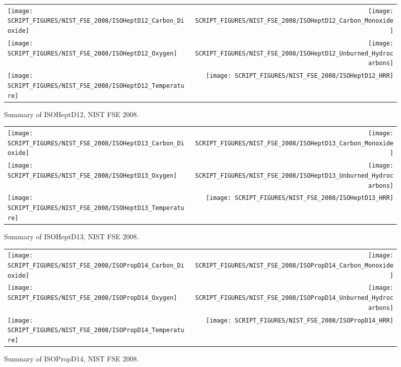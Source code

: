 \begin{figure}[h]
\begin{tabular*}{\textwidth}{l@{\extracolsep{\fill}}r}
\texttt{[image: SCRIPT\_FIGURES/NIST\_FSE\_2008/ISOHeptD12\_Carbon\_Dioxide]} &
\texttt{[image: SCRIPT\_FIGURES/NIST\_FSE\_2008/ISOHeptD12\_Carbon\_Monoxide]} \\
\texttt{[image: SCRIPT\_FIGURES/NIST\_FSE\_2008/ISOHeptD12\_Oxygen]} &
\texttt{[image: SCRIPT\_FIGURES/NIST\_FSE\_2008/ISOHeptD12\_Unburned\_Hydrocarbons]} \\
\texttt{[image: SCRIPT\_FIGURES/NIST\_FSE\_2008/ISOHeptD12\_Temperature]} &
\texttt{[image: SCRIPT\_FIGURES/NIST\_FSE\_2008/ISOHeptD12\_HRR]}
\end{tabular*}
\caption[Summary of ISOHeptD12, NIST FSE 2008]{Summary of ISOHeptD12, NIST FSE 2008.}
\label{NIST_FSE_1994_ISOHeptD12}
\end{figure}

\begin{figure}[h]
\begin{tabular*}{\textwidth}{l@{\extracolsep{\fill}}r}
\texttt{[image: SCRIPT\_FIGURES/NIST\_FSE\_2008/ISOHeptD13\_Carbon\_Dioxide]} &
\texttt{[image: SCRIPT\_FIGURES/NIST\_FSE\_2008/ISOHeptD13\_Carbon\_Monoxide]} \\
\texttt{[image: SCRIPT\_FIGURES/NIST\_FSE\_2008/ISOHeptD13\_Oxygen]} &
\texttt{[image: SCRIPT\_FIGURES/NIST\_FSE\_2008/ISOHeptD13\_Unburned\_Hydrocarbons]} \\
\texttt{[image: SCRIPT\_FIGURES/NIST\_FSE\_2008/ISOHeptD13\_Temperature]} &
\texttt{[image: SCRIPT\_FIGURES/NIST\_FSE\_2008/ISOHeptD13\_HRR]}
\end{tabular*}
\caption[Summary of ISOHeptD13, NIST FSE 2008]{Summary of ISOHeptD13, NIST FSE 2008.}
\label{NIST_FSE_1994_ISOHeptD13}
\end{figure}

\begin{figure}[h]
\begin{tabular*}{\textwidth}{l@{\extracolsep{\fill}}r}
\texttt{[image: SCRIPT\_FIGURES/NIST\_FSE\_2008/ISOPropD14\_Carbon\_Dioxide]} &
\texttt{[image: SCRIPT\_FIGURES/NIST\_FSE\_2008/ISOPropD14\_Carbon\_Monoxide]} \\
\texttt{[image: SCRIPT\_FIGURES/NIST\_FSE\_2008/ISOPropD14\_Oxygen]} &
\texttt{[image: SCRIPT\_FIGURES/NIST\_FSE\_2008/ISOPropD14\_Unburned\_Hydrocarbons]} \\
\texttt{[image: SCRIPT\_FIGURES/NIST\_FSE\_2008/ISOPropD14\_Temperature]} &
\texttt{[image: SCRIPT\_FIGURES/NIST\_FSE\_2008/ISOPropD14\_HRR]}
\end{tabular*}
\caption[Summary of ISOPropD14, NIST FSE 2008]{Summary of ISOPropD14, NIST FSE 2008.}
\label{NIST_FSE_1994_ISOPropD14}
\end{figure}

